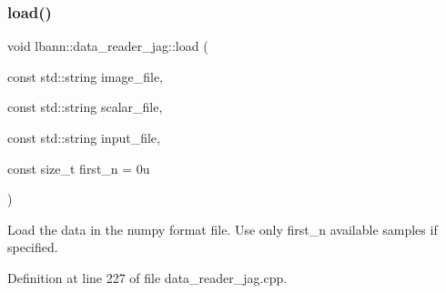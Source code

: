 \subsubsection{\texorpdfstring{load()}{load()}\hspace{0.1cm}{\footnotesize\ttfamily [2/2]}}
{\footnotesize\ttfamily void lbann\+::data\+\_\+reader\+\_\+jag\+::load (\begin{DoxyParamCaption}\item[{const std\+::string}]{image\+\_\+file,  }\item[{const std\+::string}]{scalar\+\_\+file,  }\item[{const std\+::string}]{input\+\_\+file,  }\item[{const size\+\_\+t}]{first\+\_\+n = {\ttfamily 0u} }\end{DoxyParamCaption})\hspace{0.3cm}{\ttfamily [protected]}}

Load the data in the numpy format file. Use only first\+\_\+n available samples if specified. 

Definition at line 227 of file data\+\_\+reader\+\_\+jag.\+cpp.


